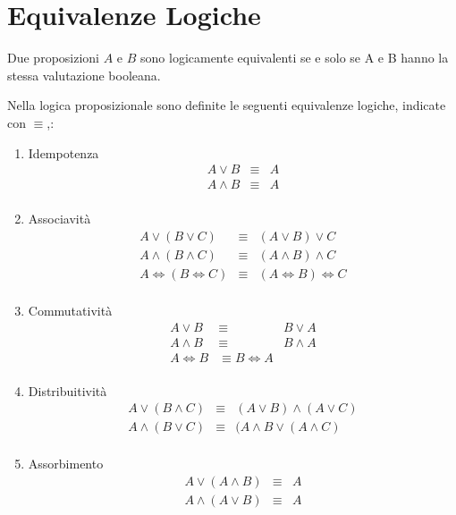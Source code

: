 \section{Equivalenze Logiche}
Due proposizioni $A$ e $B$ sono logicamente equivalenti se e solo se A e B hanno
la stessa valutazione booleana.

Nella logica proposizionale sono definite le seguenti equivalenze logiche, indicate con $\equiv$,:
\begin{enumerate}
    \item Idempotenza
            \begin{align*}
                A \lor B & \equiv & A \\
                A \land B & \equiv & A \\
            \end{align*}
    \item Associavità
            \begin{align*}
                A \lor (B \lor C) & \equiv & (A \lor B) \lor C \\
                A \land (B \land C) & \equiv & (A \land B) \land C \\
                A \iff (B \iff C) & \equiv & (A \iff B) \iff C \\
            \end{align*}
    \item Commutatività
            \begin{align*}
                A \lor B & \equiv & B \lor A \\
                A \land B & \equiv & B \land A \\
                A \iff B & \equiv B \iff A \\
            \end{align*}
    \item Distribuitività
            \begin{align*}
                A \lor (B \land C) & \equiv & (A \lor B) \land (A \lor C)\\
                A \land (B \lor C) & \equiv & (A \land B \lor (A \land C) \\
            \end{align*}
    \item Assorbimento
            \begin{align*}
                A \lor (A \land B) & \equiv & A \\
                A \land (A \lor B) & \equiv & A \\
            \end{align*}

\end{enumerate}
